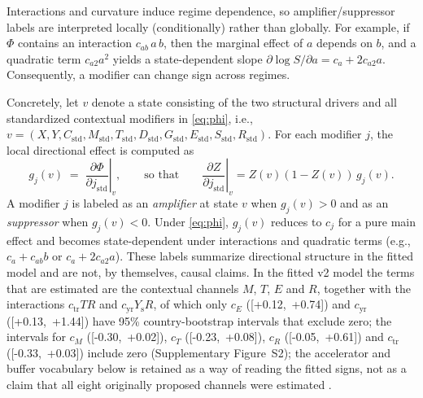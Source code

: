 \documentclass[11pt]{article}
\begin{document}
Interactions and curvature induce regime dependence, so amplifier/suppressor labels are interpreted locally (conditionally) rather than globally. For example, if $\Phi$ contains an interaction $c_{ab}\,a\,b$, then the marginal effect of $a$ depends on $b$, and a quadratic term $c_{a2}a^2$ yields a state-dependent slope $\partial \log S/\partial a = c_a + 2c_{a2}a$. Consequently, a modifier can change sign across regimes.

Concretely, let $v$ denote a state consisting of the two structural drivers and all standardized contextual modifiers in \eqref{eq:phi}, i.e., $v=(X,Y,C_{\mathrm{std}},M_{\mathrm{std}},T_{\mathrm{std}},D_{\mathrm{std}},G_{\mathrm{std}},E_{\mathrm{std}},S_{\mathrm{std}},R_{\mathrm{std}})$.
For each modifier $j$, the local directional effect is computed as
\[
g_j(v)\;=\;\left.\frac{\partial \Phi}{\partial j_{\mathrm{std}}}\right|_{v},
\qquad\text{so that}\qquad
\left.\frac{\partial Z}{\partial j_{\mathrm{std}}}\right|_{v}=Z(v)(1-Z(v))\,g_j(v).
\]
A modifier $j$ is labeled as an \emph{amplifier} at state $v$ when $g_j(v)>0$ and as an \emph{suppressor} when $g_j(v)<0$. Under \eqref{eq:phi}, $g_j(v)$ reduces to $c_j$ for a pure main effect and becomes state-dependent under interactions and quadratic terms (e.g., $c_a+c_{ab}b$ or $c_a+2c_{a2}a$). These labels summarize directional structure in the fitted model and are not, by themselves, causal claims. In the fitted v2 model the terms that are estimated are the contextual channels $M$, $T$, $E$ and $R$, together with the interactions $c_{\mathrm{tr}}TR$ and $c_{\mathrm{yr}}Y_{\mathrm{s}}R$, of which only $c_E$ ([+0.12,\ +0.74]) and $c_{\mathrm{yr}}$ ([+0.13,\ +1.44]) have 95\% country-bootstrap intervals that exclude zero; the intervals for $c_M$ ([-0.30,\ +0.02]), $c_T$ ([-0.23,\ +0.08]), $c_R$ ([-0.05,\ +0.61]) and $c_{\mathrm{tr}}$ ([-0.33,\ +0.03]) include zero (Supplementary Figure~S2); the accelerator and buffer vocabulary below is retained as a way of reading the fitted signs, not as a claim that all eight originally proposed channels were estimated \parencite{McAdam1996,Putnam2000,Prior2007,Sunstein2018,TajfelTurner1979,MeltzerRichard1981,Coleman1988,Hastie2009ESL}.
\end{document}
